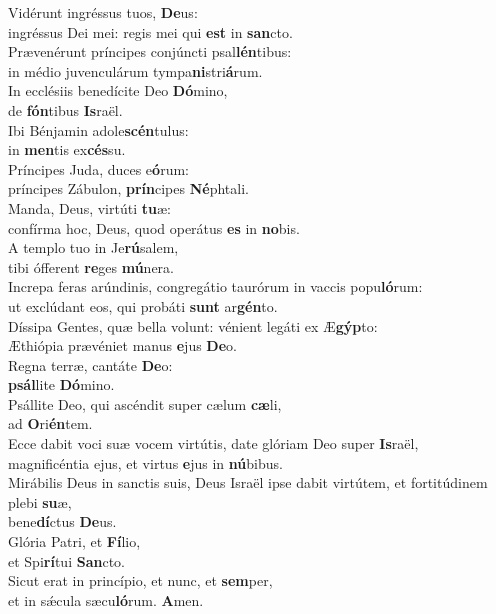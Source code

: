 \evenverse Vidérunt ingréssus tuos, \textbf{De}us:~\*\\
\evenverse ingréssus Dei mei: regis mei qui \textbf{est} in \textbf{san}cto.\\
\oddverse Prævenérunt príncipes conjúncti psal\textbf{lén}tibus:~\*\\
\oddverse in médio juvenculárum tympa\textbf{ni}stri\textbf{á}rum.\\
\evenverse In ecclésiis benedícite Deo \textbf{Dó}mino,~\*\\
\evenverse de \textbf{fón}tibus \textbf{Is}raël.\\
\oddverse Ibi Bénjamin adole\textbf{scén}tulus:~\*\\
\oddverse in \textbf{men}tis ex\textbf{cés}su.\\
\evenverse Príncipes Juda, duces e\textbf{ó}rum:~\*\\
\evenverse príncipes Zábulon, \textbf{prín}cipes \textbf{Né}phtali.\\
\oddverse Manda, Deus, virtúti \textbf{tu}æ:~\*\\
\oddverse confírma hoc, Deus, quod operátus \textbf{es} in \textbf{no}bis.\\
\evenverse A templo tuo in Je\textbf{rú}salem,~\*\\
\evenverse tibi ófferent \textbf{re}ges \textbf{mú}nera.\\
\oddverse Increpa feras arúndinis, congregátio taurórum in vaccis popu\textbf{ló}rum:~\*\\
\oddverse ut exclúdant eos, qui probáti \textbf{sunt} ar\textbf{gén}to.\\
\evenverse Díssipa Gentes, quæ bella volunt: vénient legáti ex Æ\textbf{gýp}to:~\*\\
\evenverse Æthiópia prævéniet manus \textbf{e}jus \textbf{De}o.\\
\oddverse Regna terræ, cantáte \textbf{De}o:~\*\\
\oddverse \textbf{psál}lite \textbf{Dó}mino.\\
\evenverse Psállite Deo, qui ascéndit super cælum \textbf{cæ}li,~\*\\
\evenverse ad \textbf{O}ri\textbf{én}tem.\\
\oddverse Ecce dabit voci suæ vocem virtútis, date glóriam Deo super \textbf{Is}raël,~\*\\
\oddverse magnificéntia ejus, et virtus \textbf{e}jus in \textbf{nú}bibus.\\
\evenverse Mirábilis Deus in sanctis suis, Deus Israël ipse dabit virtútem, et fortitúdinem plebi \textbf{su}æ,~\*\\
\evenverse bene\textbf{dí}ctus \textbf{De}us.\\
\oddverse Glória Patri, et \textbf{Fí}lio,~\*\\
\oddverse et Spi\textbf{rí}tui \textbf{San}cto.\\
\evenverse Sicut erat in princípio, et nunc, et \textbf{sem}per,~\*\\
\evenverse et in sǽcula sæcu\textbf{ló}rum. \textbf{A}men.\\
